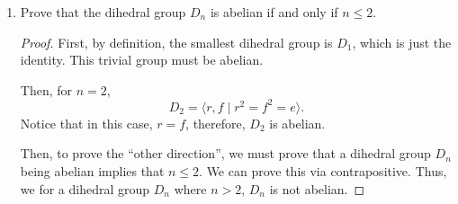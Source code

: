 \documentclass{article}
\begin{document}
\begin{enumerate}
{\begin{enumerate}
{\begin{enumerate}
{                \begin{proof}
                    Let 
                    \[
                        A = 
                            \begin{bmatrix}
                                a & b \\
                                c & d 
                            \end{bmatrix},
                        B = 
                            \begin{bmatrix}
                                p & q \\
                                r & s
                            \end{bmatrix}.
                    \]

                    Then, \(A \times B = \begin{bmatrix}
                        ap + br & aq + bs \\
                        cp + dr & cq + ds 
                    \end{bmatrix} \) and 
                    \(B \times A = \begin{bmatrix}
                        ap + cq & bp + dq \\
                        ar + cs & br + ds 
                    \end{bmatrix}\).

                    In general, these are not the same matrix.
                \end{proof}
            }
            
            \item {
                Prove that the dihedral group \(D_n\) is abelian if and only if \(n \leq 2\).
                
                \begin{proof}
                    First, by definition, the smallest dihedral group is \(D_1\), 
                    which is just the identity. This trivial group must be abelian. 

                    Then, for \(n = 2\),
                    \[D_2 = \langle r, f \mid r^2 = f^2 = e \rangle. \]
                    Notice that in this case, \(r = f\), therefore, \(D_2\) is 
                    abelian.

                    Then, to prove the ``other direction'', we must prove that 
                    a dihedral group \(D_n\) being abelian implies that \(n \leq 2\).
                    We can prove this via contrapositive. Thus, we for a dihedral
                    group \(D_n\) where \(n > 2\), \(D_n\) is not abelian.


\end{proof}}
\end{enumerate}}
\end{enumerate}}
\end{enumerate}
\end{document}
